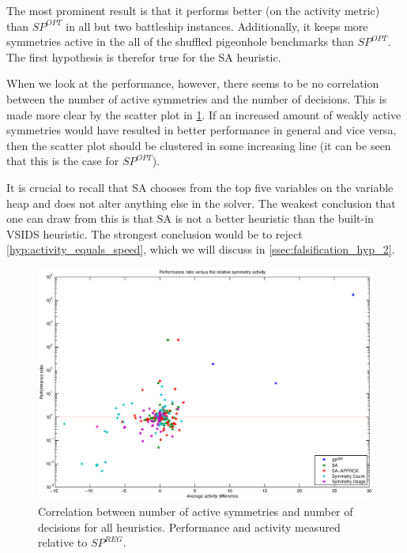 	The most prominent result is that it performs better (on the activity metric) than $SP^{OPT}$ in
	all but two battleship instances.
	Additionally, it keeps more symmetries active in the all of the shuffled pigeonhole benchmarks
	than $SP^{OPT}$.
	The first hypothesis is therefor true for the SA heuristic.

	When we look at the performance, however, there seems to be no correlation
	between the number of active symmetries and the number of decisions.
	This is made more clear by the scatter plot in \cref{fig:correlation}.
	If an increased amount of weakly active symmetries would have resulted in better performance in
	general and vice versa, then the scatter plot should be clustered in some increasing line (it can be
	seen that this is the case for $SP^{OPT}$).

	It is crucial to recall that SA chooses from the top five variables on the variable heap and
	does not alter anything else in the solver.
	The weakest conclusion that one can draw from this is that SA is not a better heuristic than the
	built-in VSIDS heuristic.
	The strongest conclusion would be to reject \cref{hyp:activity_equals_speed}, which we will discuss in
	\ref{ssec:falsification_hyp_2}.

	\begin{figure}[!ht]
		\center
		\centerline{\includegraphics[width=1.2\textwidth]{results/scatterplot_activity.eps}}
		\caption{
			Correlation between number of active symmetries and number of decisions for all
			heuristics. Performance and activity measured relative to $SP^{REG}$.
		}
		\label{fig:correlation}
	\end{figure}

